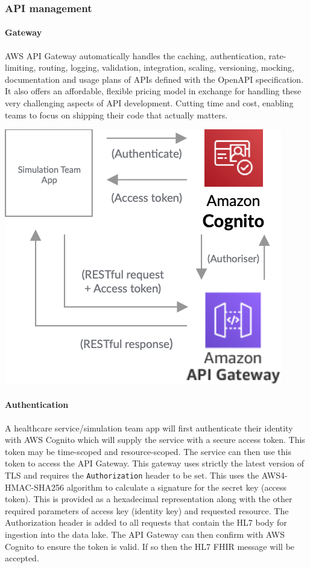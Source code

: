 \documentclass[10pt]{article}
\begin{document}
\subsubsection{API management}
\begin{minipage}{\textwidth}
	
\paragraph{Gateway}
AWS API Gateway automatically handles the caching, authentication, rate-limiting, routing, logging, validation, integration, scaling, versioning, mocking, documentation and usage plans of APIs defined with the OpenAPI specification. It also offers an affordable, flexible pricing model in exchange for handling these very challenging aspects of API development. Cutting time and cost, enabling teams to focus on shipping their code that actually matters.
\\

\begin{center}
	\centering
	\includegraphics[width=0.4\linewidth]{images/APIGateway.png}
\end{center}

\paragraph{Authentication}
A healthcare service/simulation team app will first authenticate their identity with AWS Cognito which will supply the service with a secure access token. This token may be time-scoped and resource-scoped. The service can then use this token to access the API Gateway. This gateway uses strictly the latest version of TLS and requires the \texttt{Authorization} header to be set. This uses the AWS4-HMAC-SHA256 algorithm to calculate a signature for the secret key (access token). This is provided as a hexadecimal representation along with the other required parameters of access key (identity key) and requested resource. The Authorization header is added to all requests that contain the HL7 body for ingestion into the data lake. The API Gateway can then confirm with AWS Cognito to ensure the token is valid. If so then the HL7 FHIR message will be accepted.


\end{minipage}
\end{document}
